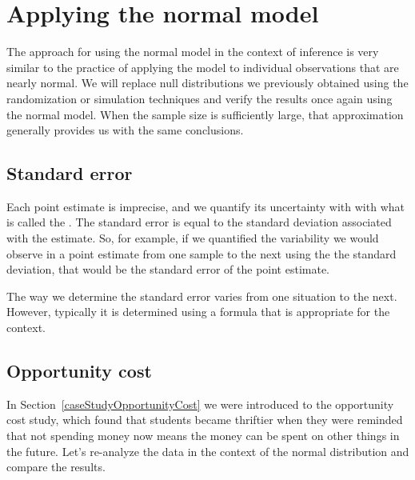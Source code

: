 \section{Applying the normal model}
\label{ApplyingTheNormalModel}

The approach for using the normal model in the context of inference is very similar to the practice of applying the model to individual observations that are nearly normal. We will replace null distributions we previously obtained using the randomization or simulation techniques and verify the results once again using the normal model. When the sample size is sufficiently large, that approximation generally provides us with the same conclusions.

\subsection{Standard error}

Each point estimate is imprecise, and we quantify its uncertainty with with what is called the . The standard error is equal to the standard deviation associated with the estimate. So, for example, if we quantified the variability we would observe in a point estimate from one sample to the next using the the standard deviation, that would be the standard error of the point estimate.


The way we determine the standard error varies from one situation to the next. However, typically it is determined using a formula that is appropriate for the context.


\subsection{Opportunity cost}

In Section~\ref{caseStudyOpportunityCost} we were introduced to the opportunity cost study, which found that students became thriftier when they were reminded that not spending money now means the money can be spent on other things in the future. Let's re-analyze the data in the context of the normal distribution and compare the results.


